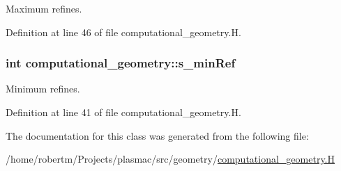 Maximum refines. 



Definition at line 46 of file computational\+\_\+geometry.\+H.

\subsubsection[{\texorpdfstring{s\+\_\+min\+Ref}{s_minRef}}]{\setlength{\rightskip}{0pt plus 5cm}int computational\+\_\+geometry\+::s\+\_\+min\+Ref\hspace{0.3cm}{\ttfamily [static]}}\hypertarget{classcomputational__geometry_affc5ce418ac8d3844f114924e6fff55e}{}\label{classcomputational__geometry_affc5ce418ac8d3844f114924e6fff55e}


Minimum refines. 



Definition at line 41 of file computational\+\_\+geometry.\+H.



The documentation for this class was generated from the following file\+:\begin{DoxyCompactItemize}
\item 
/home/robertm/\+Projects/plasmac/src/geometry/\hyperlink{computational__geometry_8H}{computational\+\_\+geometry.\+H}\end{DoxyCompactItemize}
